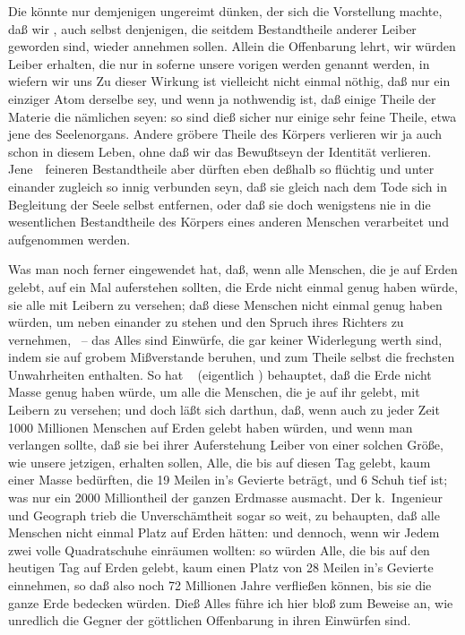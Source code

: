 \begin{aufza}
Die  könnte nur demjenigen ungereimt dünken, der sich die Vorstellung machte, daß wir , auch selbst denjenigen, die seitdem Bestandtheile anderer Leiber geworden sind, wieder annehmen sollen. Allein die Offenbarung lehrt, wir würden  Leiber erhalten, die nur in soferne unsere vorigen werden genannt werden, in wiefern wir uns  Zu dieser Wirkung ist vielleicht nicht einmal nöthig, daß nur ein einziger Atom derselbe sey, und wenn ja nothwendig ist, daß einige Theile der Materie die nämlichen seyen: so sind dieß sicher nur einige sehr feine Theile, etwa jene des Seelenorgans. Andere gröbere Theile des Körpers verlieren wir ja auch schon in diesem Leben, ohne daß wir das Bewußtseyn der Identität verlieren. Jene~\ feineren Bestandtheile aber dürften eben deßhalb so flüchtig und unter einander zugleich so innig verbunden seyn, daß sie gleich nach dem Tode sich in Begleitung der Seele selbst entfernen, oder daß sie doch wenigstens nie in die wesentlichen Bestandtheile des Körpers eines anderen Menschen verarbeitet und aufgenommen werden.
\begin{RWanm} 
Was man noch ferner eingewendet hat, daß, wenn alle Menschen, die je auf Erden gelebt, auf ein Mal auferstehen sollten, die Erde nicht einmal  genug haben würde, sie alle mit Leibern zu versehen; daß diese Menschen nicht einmal  genug haben würden, um neben einander zu stehen und den Spruch ihres Richters zu vernehmen, \usw\ -- das Alles sind Einwürfe, die gar keiner Widerlegung werth sind, indem sie auf grobem Mißverstande beruhen, und zum Theile selbst die frechsten Unwahrheiten enthalten. So hat \zB\  (eigentlich ) behauptet, daß die Erde nicht Masse genug haben würde, um alle die Menschen, die je auf ihr gelebt, mit Leibern zu versehen; und doch läßt sich darthun, daß, wenn auch zu jeder Zeit 1000 Millionen Menschen auf Erden gelebt haben würden, und wenn man verlangen sollte, daß sie bei ihrer Auferstehung Leiber von einer solchen Größe, wie unsere jetzigen, erhalten sollen, Alle, die bis auf diesen Tag gelebt, kaum einer Masse bedürften, die 19 Meilen in's Gevierte beträgt, und 6 Schuh tief ist; was nur ein 2000 Milliontheil der ganzen Erdmasse ausmacht. Der k.~Ingenieur und Geograph  trieb die Unverschämtheit sogar so weit, zu behaupten, daß alle Menschen nicht einmal Platz auf Erden hätten: und dennoch, wenn wir Jedem zwei volle Quadratschuhe einräumen wollten: so würden Alle, die bis auf den heutigen Tag auf Erden gelebt, kaum einen Platz von 28 Meilen in's Gevierte einnehmen, so daß also noch 72 Millionen Jahre verfließen können, bis sie die ganze Erde bedecken würden. Dieß Alles führe ich hier bloß zum Beweise an, wie unredlich die Gegner der göttlichen Offenbarung in ihren Einwürfen sind. 

\end{RWanm}
\end{aufza}

